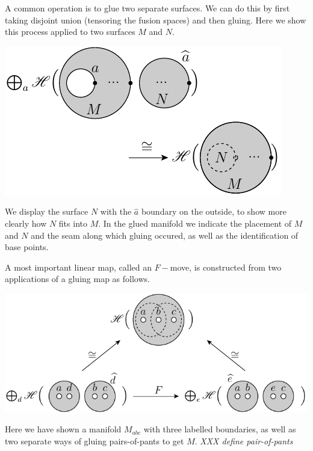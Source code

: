 \documentclass[aps, prl, letterpaper, twocolumn, superscriptaddress, notitlepage, 10pt]{revtex4-1}
\begin{document}
A common operation is to glue two separate surfaces.
We can do this by first taking disjoint union (tensoring
the fusion spaces)
and then gluing.
Here we show this process applied to two surfaces $M$ and $N$. 
\begin{center}
\includegraphics[]{pic-glue.pdf}
\end{center}
We display the surface $N$ with the $\widehat{a}$
boundary on the outside, 
to show more clearly how $N$ fits into $M$.
In the glued manifold we
indicate the placement of $M$ and $N$ and the seam
along which gluing occured,
as well as the identification of base points.


A most important linear map, called an $F-$move,
is constructed from two applications of a
gluing map as follows.

\begin{widetext}
\begin{center}
\includegraphics[]{pic-glue-fmove.pdf}
\end{center}
\end{widetext}

Here we have shown a manifold $M_{abc}$ with 
three labelled boundaries, as well as two separate
ways of gluing pairs-of-pants to get $M.$
\emph{XXX define pair-of-pants}
\end{document}
